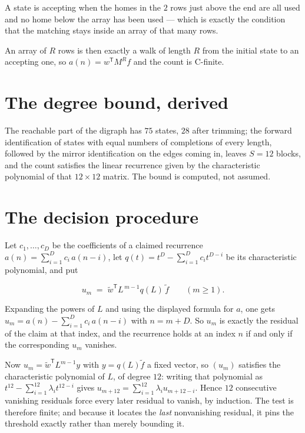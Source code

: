 \documentclass[11pt]{article}
\theoremstyle{definition}
\begin{document}
A state is accepting when the homes in the $2$ rows just above the end are all used and no home below the array has been used --- which is exactly the condition that the matching stays inside an array of that many rows.

An array of $R$ rows is then exactly a walk of length $R$ from the initial state to an accepting one, so $a(n) = w^{\mathsf T}M^{R}f$ and the count is C-finite.

\section{The degree bound, derived}

The reachable part of the digraph has $75$ states, $28$ after trimming; the forward identification of states with equal numbers of completions of every length, followed by the mirror identification on the edges coming in, leaves $S = 12$ blocks, and the count satisfies the linear recurrence given by the characteristic polynomial of that $12\times12$ matrix. The bound is computed, not assumed.

\section{The decision procedure}

Let $c_1,\dots,c_D$ be the coefficients of a claimed recurrence $a(n) = \sum_{i=1}^{D} c_i\,a(n-i)$, let $q(t) = t^{D} - \sum_{i=1}^{D} c_i t^{D-i}$ be its characteristic polynomial, and put

\[u_m \;=\; \tilde w^{\mathsf T} L^{\,m-1} q(L)\,\tilde f \qquad (m \ge 1).\]

Expanding the powers of $L$ and using the displayed formula for $a$, one gets $u_m = a(n) - \sum_{i=1}^{D} c_i\,a(n-i)$ with $n = m + D$. So $u_m$ is exactly the residual of the claim at that index, and the recurrence holds at an index $n$ if and only if the corresponding $u_m$ vanishes.

Now $u_m = \tilde w^{\mathsf T} L^{m-1} y$ with $y = q(L)\tilde f$ a fixed vector, so $(u_m)$ satisfies the characteristic polynomial of $L$, of degree $12$: writing that polynomial as $t^{12} - \sum_{i=1}^{12} \lambda_i t^{12-i}$ gives $u_{m+12} = \sum_{i=1}^{12} \lambda_i u_{m+12-i}$. Hence $12$ consecutive vanishing residuals force every later residual to vanish, by induction. The test is therefore finite; and because it locates the {\itshape last} nonvanishing residual, it pins the threshold exactly rather than merely bounding it.
\end{document}
